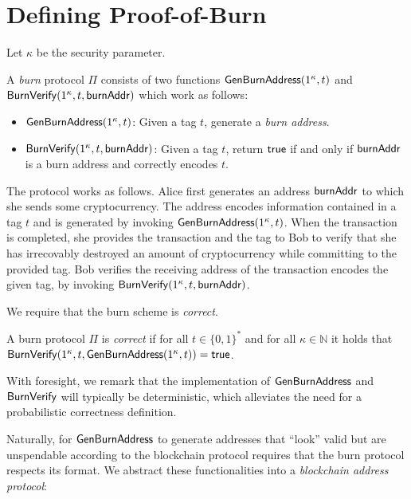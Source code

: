 \section{Defining Proof-of-Burn}

Let $\kappa$ be the security parameter.

\begin{definition}
  A \emph{burn} protocol $\Pi$ consists of two functions $\mathsf{Gen}\-\mathsf{Burn}\-\mathsf{Address}(1^\kappa, t)$ and $\mathsf{BurnVerify}(1^\kappa, t, \mathsf{burnAddr})$ which work as follows:

  \begin{itemize}
    \item $\mathsf{Gen}\-\mathsf{Burn}\-\mathsf{Address}(1^\kappa, t)$: Given a tag $t$, generate a \emph{burn address}.

    \item $\mathsf{BurnVerify}(1^\kappa, t, \mathsf{burnAddr})$: Given a tag $t$, return $\sf{true}$ if and only if $\mathsf{burnAddr}$ is a burn address and correctly encodes $t$.
  \end{itemize}
\end{definition}

The protocol works as follows. Alice first generates an address $\mathsf{burnAddr}$ to which she sends some cryptocurrency. The address encodes information contained in a tag $t$ and is generated by invoking $\mathsf{Gen}\-\mathsf{Burn}\-\mathsf{Address}(1^\kappa, t)$. When the transaction is completed, she provides the transaction and the tag to Bob to verify that she has irrecovably destroyed an amount of cryptocurrency while committing to the provided tag. Bob verifies the receiving address of the transaction encodes the given tag, by invoking $\mathsf{BurnVerify}(1^\kappa, t, \mathsf{burnAddr})$.

We require that the burn scheme is \emph{correct}.

\begin{definition}[Correctness]
  A burn protocol $\Pi$ is \emph{correct} if for all $t \in \{0,1\}^*$ and for all $\kappa \in \mathbb{N}$ it holds that
  $\mathsf{BurnVerify}(1^\kappa, t, \mathsf{Gen}\-\mathsf{Burn}\-\mathsf{Address}(1^\kappa, t)) = \mathsf{true}$.
\end{definition}

With foresight, we remark that the implementation of $\mathsf{Gen}\-\mathsf{Burn}\-\mathsf{Address}$ and $\mathsf{BurnVerify}$ will typically be deterministic, which alleviates the need for a probabilistic correctness definition.

Naturally, for $\mathsf{Gen}\-\mathsf{Burn}\-\mathsf{Address}$ to generate addresses that ``look'' valid but are unspendable according to the blockchain protocol requires that the burn protocol respects its format. We abstract these functionalities into a \emph{blockchain address protocol}:

